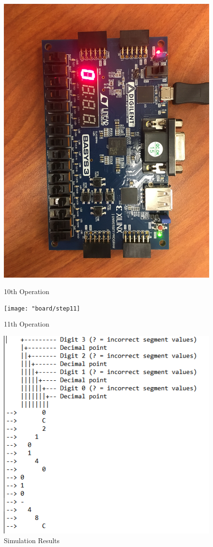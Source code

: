 \documentclass[11pt]{article}
\begin{document}
\begin{figure}[ht]
	\centering
	\includegraphics[width=12cm]{"board/step10"}
	\caption{10th Operation}
	\texttt{[image: "board/step11]}
	\caption{11th Operation}
\end{figure}

\begin{figure}[ht]
	\centering
	\includegraphics[width=12cm]{"simulation_results"}
	\caption{Simulation Results}
\end{figure}



\end{document}
